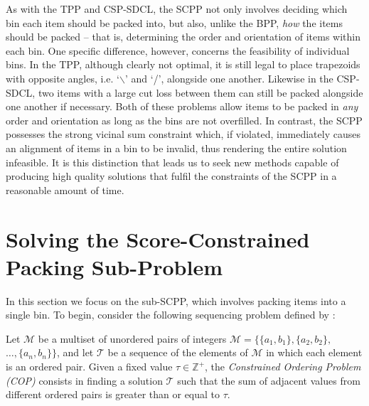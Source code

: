 \documentclass[a4paper,11pt,authoryear]{elsarticle}
\begin{document}
As with the TPP and CSP-SDCL, the SCPP not only involves deciding which bin each item should be packed into, but also, unlike the BPP, \emph{how} the items should be packed -- that is, determining the order and orientation of items within each bin. One specific difference, however, concerns the feasibility of individual bins. In the TPP, although clearly not optimal, it is still legal to place trapezoids with opposite angles, i.e. `$\backslash$' and `/', alongside one another. Likewise in the CSP-SDCL, two items with a large cut loss between them can still be packed alongside one another if necessary. Both of these problems allow items to be packed in \emph{any} order and orientation as long as the bins are not overfilled. In contrast, the SCPP possesses the strong vicinal sum constraint which, if violated, immediately causes an alignment of items in a bin to be invalid, thus rendering the entire solution infeasible. It is this distinction that leads us to seek new methods capable of producing high quality solutions that fulfil the constraints of the SCPP in a reasonable amount of time.

\section{Solving the Score-Constrained Packing Sub-Problem}
\label{sec:ahc}

\noindent In this section we focus on the sub-SCPP, which involves packing items into a single bin. To begin, consider the following sequencing problem defined by \cite{hawa2018}:

\begin{definition} %
	Let $\mathcal{M}$ be a multiset of unordered pairs of integers $\mathcal{M} = \{\{a_1, b_1\}, \{a_2, b_2\},$ $\dotsc,\{a_n, b_n\}\}$, and let $\mathcal{T}$ be a sequence of the elements of $\mathcal{M}$ in which each element is an ordered pair. Given a fixed value $\tau \in \mathbb{Z}^+$, the \emph{Constrained Ordering Problem (COP)} consists in finding a solution $\mathcal{T}$ such that the sum of adjacent values from different ordered pairs is greater than or equal to $\tau$.
	\label{defn:cop}
\end{definition}
\end{document}
